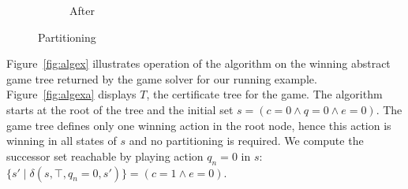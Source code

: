 \begin{figure}[b]
\begin{subfigure}[t]{.3\textwidth}
\begin{minipage}[t][3cm][t]{\textwidth}
        \end{minipage}
        \caption{After}
    \end{subfigure}%
    \hspace*{\fill}
    \caption{Partitioning}
    \label{fig:partition}
\end{figure}

Figure~\ref{fig:algex} illustrates operation of the algorithm on the winning abstract game tree returned by the game solver for our running example.  Figure~\ref{fig:algexa} displays $T$, the certificate tree for the game. The algorithm starts at the root of the tree and the initial set $s = (c = 0 \land q = 0 \land e = 0)$.  The game tree defines only one winning action in the root node, hence this action is winning in all states of $s$ and no partitioning is required.  We compute the successor set reachable by playing action $q_n = 0$ in $s$: $\{ s' \mid \delta(s, \top, q_n = 0, s') \} = (c = 1 \land e = 0) $.


